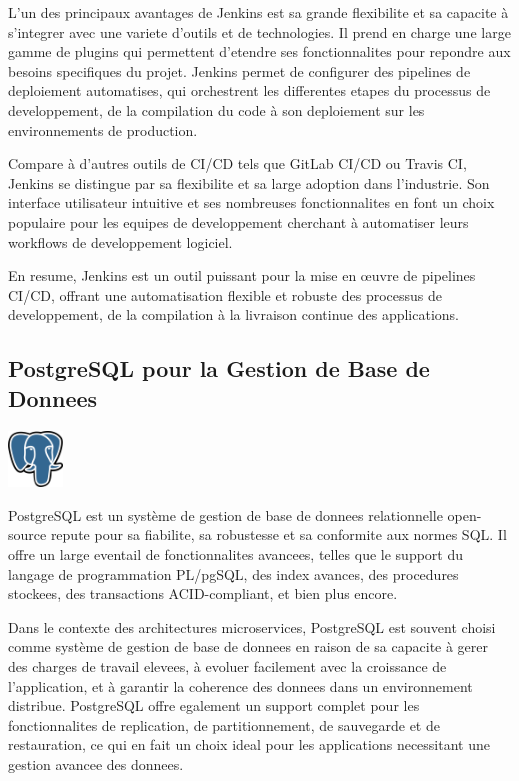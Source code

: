 \documentclass[a4paper, 11pt, openany]{report}
\begin{document}
L'un des principaux avantages de Jenkins est sa grande flexibilite et sa capacite à s'integrer avec une variete d'outils et de technologies. Il prend en charge une large gamme de plugins qui permettent d'etendre ses fonctionnalites pour repondre aux besoins specifiques du projet. Jenkins permet de configurer des pipelines de deploiement automatises, qui orchestrent les differentes etapes du processus de developpement, de la compilation du code à son deploiement sur les environnements de production.

Compare à d'autres outils de CI/CD tels que GitLab CI/CD ou Travis CI, Jenkins se distingue par sa flexibilite et sa large adoption dans l'industrie. Son interface utilisateur intuitive et ses nombreuses fonctionnalites en font un choix populaire pour les equipes de developpement cherchant à automatiser leurs workflows de developpement logiciel.

En resume, Jenkins est un outil puissant pour la mise en œuvre de pipelines CI/CD, offrant une automatisation flexible et robuste des processus de developpement, de la compilation à la livraison continue des applications.


\subsection{PostgreSQL pour la Gestion de Base de Donnees}
\begin{center}
\includegraphics[height=1.5cm]{assets/images/postgres.png}
\end{center}

PostgreSQL est un système de gestion de base de donnees relationnelle open-source repute pour sa fiabilite, sa robustesse et sa conformite aux normes SQL. Il offre un large eventail de fonctionnalites avancees, telles que le support du langage de programmation PL/pgSQL, des index avances, des procedures stockees, des transactions ACID-compliant, et bien plus encore.

Dans le contexte des architectures microservices, PostgreSQL est souvent choisi comme système de gestion de base de donnees en raison de sa capacite à gerer des charges de travail elevees, à evoluer facilement avec la croissance de l'application, et à garantir la coherence des donnees dans un environnement distribue. PostgreSQL offre egalement un support complet pour les fonctionnalites de replication, de partitionnement, de sauvegarde et de restauration, ce qui en fait un choix ideal pour les applications necessitant une gestion avancee des donnees.
\end{document}
